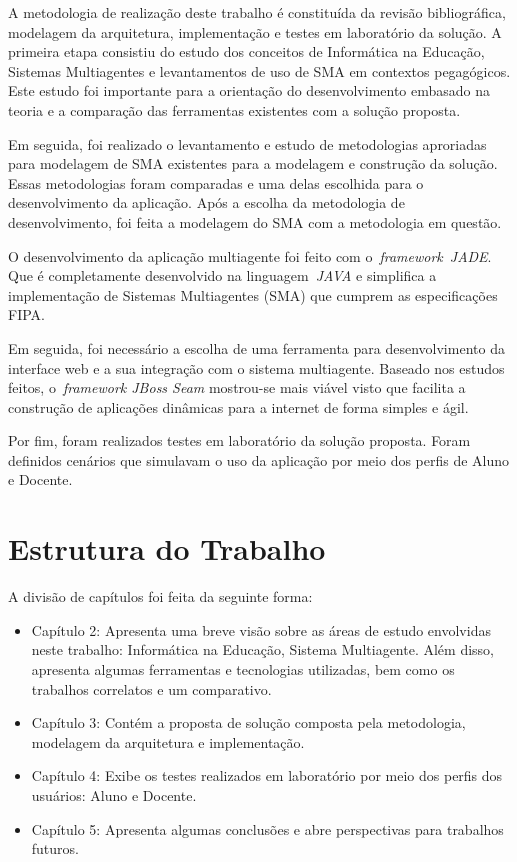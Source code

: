 A metodologia de realização deste trabalho é constituída da revisão bibliográfica, modelagem da arquitetura, implementação e testes em laboratório da solução. A primeira etapa consistiu do estudo dos conceitos de Informática na Educação, Sistemas Multiagentes e levantamentos de uso de SMA em contextos pegagógicos. Este estudo foi importante para a orientação do desenvolvimento embasado na teoria e a comparação das ferramentas existentes com a solução proposta.

Em seguida, foi realizado o levantamento e estudo de metodologias aproriadas para modelagem de SMA existentes para a modelagem e construção da solução. Essas metodologias foram comparadas e uma delas escolhida para o desenvolvimento da aplicação. Após a escolha da metodologia de desenvolvimento, foi feita a modelagem do SMA com a metodologia em questão.

O desenvolvimento da aplicação multiagente foi feito com o~\emph{framework}~\emph{JADE}. Que é completamente desenvolvido na linguagem~\emph{JAVA} e simplifica a implementação de Sistemas Multiagentes (SMA) que cumprem as especificações FIPA. 

Em seguida, foi necessário a escolha de uma ferramenta para desenvolvimento da interface web e a sua integração com o sistema multiagente. Baseado nos estudos feitos, o~\emph{framework JBoss Seam} mostrou-se mais viável visto que facilita a construção de aplicações dinâmicas para a internet de forma simples e ágil.

Por fim, foram realizados testes em laboratório da solução proposta. Foram definidos cenários que simulavam o uso da aplicação por meio dos perfis de Aluno e Docente.

\section{Estrutura do Trabalho}
A divisão de capítulos foi feita da seguinte forma:
\begin{itemize}
	\item Capítulo 2: Apresenta uma breve visão sobre as áreas de estudo envolvidas neste trabalho: Informática na Educação, Sistema Multiagente. Além disso, apresenta algumas ferramentas e tecnologias utilizadas, bem como os trabalhos correlatos e um comparativo.
	\item Capítulo 3: Contém a proposta de solução composta pela metodologia, modelagem da arquitetura e implementação.
	\item Capítulo 4: Exibe os testes realizados em laboratório por meio dos perfis dos usuários: Aluno e Docente.
	\item Capítulo 5: Apresenta algumas conclusões e abre perspectivas para trabalhos futuros.
\end{itemize}
